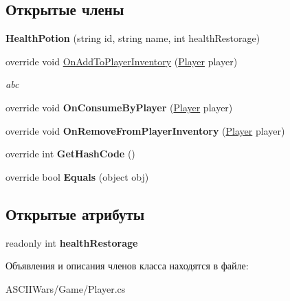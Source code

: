 \subsection*{Открытые члены}
\begin{DoxyCompactItemize}
\item 
\hypertarget{class_a_s_c_i_i_wars_1_1_game_1_1_health_potion_a8f1763067ff0af22657b7447fe96cc66}{}\label{class_a_s_c_i_i_wars_1_1_game_1_1_health_potion_a8f1763067ff0af22657b7447fe96cc66} 
{\bfseries Health\+Potion} (string id, string name, int health\+Restorage)
\item 
\hypertarget{class_a_s_c_i_i_wars_1_1_game_1_1_health_potion_aecf685e26442760c13e59f294ce7a5e7}{}\label{class_a_s_c_i_i_wars_1_1_game_1_1_health_potion_aecf685e26442760c13e59f294ce7a5e7} 
override void \hyperlink{class_a_s_c_i_i_wars_1_1_game_1_1_health_potion_aecf685e26442760c13e59f294ce7a5e7}{On\+Add\+To\+Player\+Inventory} (\hyperlink{class_a_s_c_i_i_wars_1_1_game_1_1_player}{Player} player)
\begin{DoxyCompactList}\small\item\em abc \end{DoxyCompactList}\item 
\hypertarget{class_a_s_c_i_i_wars_1_1_game_1_1_health_potion_a3004d1c2396e9c068ed4e03884afd56c}{}\label{class_a_s_c_i_i_wars_1_1_game_1_1_health_potion_a3004d1c2396e9c068ed4e03884afd56c} 
override void {\bfseries On\+Consume\+By\+Player} (\hyperlink{class_a_s_c_i_i_wars_1_1_game_1_1_player}{Player} player)
\item 
\hypertarget{class_a_s_c_i_i_wars_1_1_game_1_1_health_potion_ad708f58b7d3cbc69945cb2ccb0328f78}{}\label{class_a_s_c_i_i_wars_1_1_game_1_1_health_potion_ad708f58b7d3cbc69945cb2ccb0328f78} 
override void {\bfseries On\+Remove\+From\+Player\+Inventory} (\hyperlink{class_a_s_c_i_i_wars_1_1_game_1_1_player}{Player} player)
\item 
\hypertarget{class_a_s_c_i_i_wars_1_1_game_1_1_health_potion_a825fcf689ad6dd4fcf48069980f8c176}{}\label{class_a_s_c_i_i_wars_1_1_game_1_1_health_potion_a825fcf689ad6dd4fcf48069980f8c176} 
override int {\bfseries Get\+Hash\+Code} ()
\item 
\hypertarget{class_a_s_c_i_i_wars_1_1_game_1_1_health_potion_a84ed6d197746ebb5a33a61b2b2e46fb9}{}\label{class_a_s_c_i_i_wars_1_1_game_1_1_health_potion_a84ed6d197746ebb5a33a61b2b2e46fb9} 
override bool {\bfseries Equals} (object obj)
\end{DoxyCompactItemize}
\subsection*{Открытые атрибуты}
\begin{DoxyCompactItemize}
\item 
\hypertarget{class_a_s_c_i_i_wars_1_1_game_1_1_health_potion_aa337067f250678b0825d86fc3e2868c5}{}\label{class_a_s_c_i_i_wars_1_1_game_1_1_health_potion_aa337067f250678b0825d86fc3e2868c5} 
readonly int {\bfseries health\+Restorage}
\end{DoxyCompactItemize}


Объявления и описания членов класса находятся в файле\+:\begin{DoxyCompactItemize}
\item 
A\+S\+C\+I\+I\+Wars/\+Game/Player.\+cs\end{DoxyCompactItemize}

